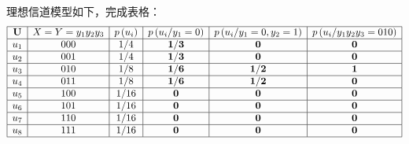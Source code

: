 \begin{remark}
    理想信道模型如下，完成表格：
    \[\begin{array}{|c|c|c|c|c|c|}
        \hline \mathbf{U} & X=Y=y_{1} y_{2} y_{3} & p\left(u_{i}\right) & p\left(u_{i} / y_{1}=0\right) & p\left(u_{i} / y_{1}=0, y_{2}=1\right) & p\left(u_{i} / y_{1} y_{2} y_{3}=010\right) \\
        \hline u_{1} & 000 & 1 / 4 & \mathbf{1 / 3} & \mathbf{0} & \mathbf{0} \\
        \hline u_{2} & 001 & 1 / 4 & \mathbf{1 / 3} & \mathbf{0} & \mathbf{0} \\
        \hline u_{3} & 010 & 1 / 8 & \mathbf{1 / 6} & \mathbf{1} / \mathbf{2} & \mathbf{1} \\
        \hline u_{4} & 011 & 1 / 8 & \mathbf{1 / 6} & \mathbf{1 / 2} & \mathbf{0} \\
        \hline u_{5} & 100 & 1 / 16 & \mathbf{0} & \mathbf{0} & \mathbf{0} \\
        \hline u_{6} & 101 & 1 / 16 & \mathbf{0} & \mathbf{0} & \mathbf{0} \\
        \hline u_{7} & 110 & 1 / 16 & \mathbf{0} & \mathbf{0} & \mathbf{0} \\
        \hline u_{8} & 111 & 1 / 16 & \mathbf{0} & \mathbf{0} & \mathbf{0} \\
        \hline
    \end{array}\]
\end{remark}

